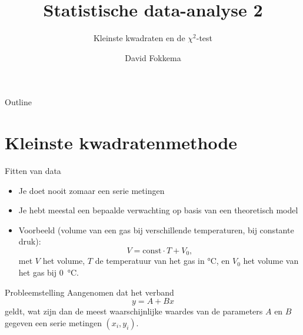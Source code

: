 \documentclass{beamer}
\title{Statistische data-analyse 2}
\subtitle{Kleinste kwadraten en de $\chi^2$-test}
\author{David Fokkema}
\institute{
  Practicum natuurkunde \\
  Vrije Universiteit / Universiteit van Amsterdam
}
\date{}
\begin{document}
\begin{frame}
  \titlepage
\end{frame}

\begin{frame}{Outline}
  \tableofcontents
\end{frame}




\section{Kleinste kwadratenmethode}

\begin{frame}{Fitten van data}
  \begin{itemize}
    \item Je doet nooit zomaar een serie metingen
    \item Je hebt meestal een bepaalde verwachting op basis van een theoretisch model
    \pause
    \item Voorbeeld (volume van een gas bij verschillende temperaturen, bij constante druk):
    \begin{equation*}
      V = \mathrm{const}\cdot T + V_0,
    \end{equation*}
    met $V$ het volume, $T$ de temperatuur van het gas in \si{\celsius}, en $V_0$ het volume van het gas bij \SI{0}{\celsius}.
  \end{itemize}
\end{frame}

\begin{frame}{Probleemstelling}
  Aangenomen dat het verband
  \begin{equation*}
    y = A + Bx
  \end{equation*}
  geldt, wat zijn dan de meest waarschijnlijke waardes van de parameters $A$ en $B$ gegeven een serie metingen $(x_i, y_i)$.
\end{frame}
\end{document}
